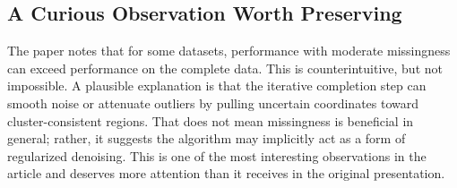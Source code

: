 \subsection{A Curious Observation Worth Preserving}
The paper notes that for some datasets, performance with moderate missingness can exceed performance on the complete data. This is counterintuitive, but not impossible. A plausible explanation is that the iterative completion step can smooth noise or attenuate outliers by pulling uncertain coordinates toward cluster-consistent regions. That does not mean missingness is beneficial in general; rather, it suggests the algorithm may implicitly act as a form of regularized denoising. This is one of the most interesting observations in the article and deserves more attention than it receives in the original presentation.
